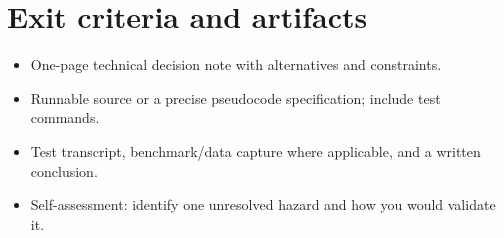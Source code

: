 \documentclass[11pt,letterpaper]{article}
\begin{document}
\section{Exit criteria and artifacts}
\begin{itemize}
\item One-page technical decision note with alternatives and constraints.
\item Runnable source or a precise pseudocode specification; include test commands.
\item Test transcript, benchmark/data capture where applicable, and a written conclusion.
\item Self-assessment: identify one unresolved hazard and how you would validate it.
\end{itemize}
\end{document}
